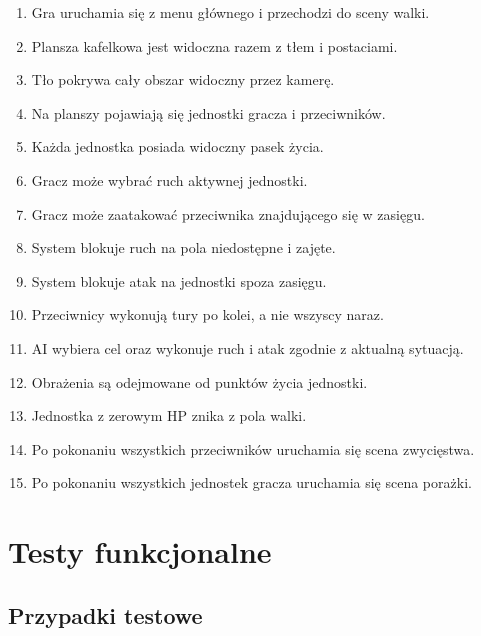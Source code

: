 \documentclass[12pt,a4paper]{article}
\begin{document}
\begin{enumerate}
    \item Gra uruchamia się z menu głównego i przechodzi do sceny walki.
    \item Plansza kafelkowa jest widoczna razem z tłem i postaciami.
    \item Tło pokrywa cały obszar widoczny przez kamerę.
    \item Na planszy pojawiają się jednostki gracza i przeciwników.
    \item Każda jednostka posiada widoczny pasek życia.
    \item Gracz może wybrać ruch aktywnej jednostki.
    \item Gracz może zaatakować przeciwnika znajdującego się w zasięgu.
    \item System blokuje ruch na pola niedostępne i zajęte.
    \item System blokuje atak na jednostki spoza zasięgu.
    \item Przeciwnicy wykonują tury po kolei, a nie wszyscy naraz.
    \item AI wybiera cel oraz wykonuje ruch i atak zgodnie z aktualną sytuacją.
    \item Obrażenia są odejmowane od punktów życia jednostki.
    \item Jednostka z zerowym HP znika z pola walki.
    \item Po pokonaniu wszystkich przeciwników uruchamia się scena zwycięstwa.
    \item Po pokonaniu wszystkich jednostek gracza uruchamia się scena porażki.
\end{enumerate}

\newpage

\section{Testy funkcjonalne}

\subsection{Przypadki testowe}
\end{document}
